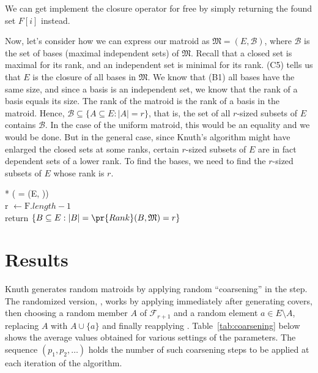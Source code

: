 We can get implement the closure operator for free by simply returning the found set $F[i]$ instead.

Now, let's consider how we can express our matroid as $\mathfrak{M} = (E, \mathcal{B})$, where $\mathcal{B}$ is the set of bases (maximal independent sets) of $\mathfrak{M}$. Recall that a closed set is maximal for its rank, and an independent set is minimal for its rank. (C5) tells us that $E$ is the closure of all bases in $\mathfrak{M}$. We know that (B1) all bases have the same size, and since a basis is an independent set, we know that the rank of a basis equals its size. The rank of the matroid is the rank of a basis in the matroid. Hence, $\mathcal{B} \subseteq \{ A\subseteq E: |A| = r\}$, that is, the set of all $r$-sized subsets of $E$ contains $\mathcal{B}$. In the case of the uniform matroid, this would be an equality and we would be done. But in the general case, since Knuth's algorithm might have enlarged the closed sets at some ranks, certain $r$-sized subsets of $E$ are in fact dependent sets of a lower rank. To find the bases, we need to find the $r$-sized subsets of $E$ whose rank is $r$.

\begin{pseudo}*
  ({ = (E, )}) \\
  r $\leftarrow \mathrm{F}.length - 1$ \\
  return $\{ B \subseteq E : |B| = \pr{Rank}(B, \mathfrak{M}) = r \}$
\end{pseudo}

\section*{Results}
Knuth generates random matroids by applying random ``coarsening'' in the  step. The randomized version, , works by applying  immediately after generating covers, then choosing a random member $A$ of $\mathcal{F}_{r+1}$ and a random element $a \in E \setminus A$, replacing $A$ with $A \cup \{a\}$ and finally reapplying . Table~\ref{tab:coarsening} below shows the average values obtained for various settings of the parameters. The sequence $(p_1, p_2, \ldots)$ holds the number of such coarsening steps to be applied at each iteration of the algorithm.

